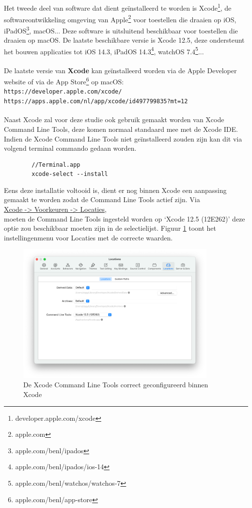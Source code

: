     \subsection{}
    \label{sec:I-Xcode}
    Het tweede deel van software dat dient geïnstalleerd te worden is Xcode\footnote{developer.apple.com/xcode}, de softwareontwikkeling omgeving van Apple\footnote{apple.com} voor toestellen die draaien op iOS, iPadOS\footnote{apple.com/benl/ipados}, macOS...  Deze software is uitsluitend beschikbaar voor toestellen die draaien op macOS. De laatste beschikbare versie is Xcode 12.5, deze ondersteunt het bouwen applicaties tot iOS 14.3, iPadOS 14.3\footnote{apple.com/benl/ipados/ios-14}, watchOS 7.4\footnote{apple.com/benl/watchos/watchos-7}... 
    \\ \\ 
    De laatste versie van \textbf{Xcode} kan geïnstalleerd worden via de Apple Developer website of via de App Store\footnote{apple.com/benl/app-store} op macOS: \\
    \verb*|https://developer.apple.com/xcode/|
    \\
    \verb*|https://apps.apple.com/nl/app/xcode/id497799835?mt=12|
    \\ \\ 
    Naast Xcode zal voor deze studie ook gebruik gemaakt worden van Xcode Command Line Tools, deze komen normaal standaard mee met de Xcode IDE. Indien de Xcode Command Line Tools niet geïnstalleerd zouden zijn kan dit via volgend terminal commando gedaan worden. \\
    \begin{lstlisting}
        //Terminal.app
        xcode-select --install
    \end{lstlisting}
    Eens deze installatie voltooid is, dient er nog binnen Xcode een aanpassing gemaakt te worden zodat de Command Line Tools actief zijn. Via \\
    \underline{Xcode -> Voorkeuren -> Locaties}, \\
    moeten de Command Line Tools ingesteld worden op `Xcode 12.5 (12E262)' deze optie zou beschikbaar moeten zijn in de selectielijst. Figuur \ref{fig:M-xcode-locations} toont het instellingenmenu voor Locaties met de correcte waarden. 
    \begin{figure}
        \centering
        \includegraphics[width=10cm]{img/xcode-locations}
        \caption{De Xcode Command Line Tools correct geconfigureerd binnen Xcode}
        \label{fig:M-xcode-locations}
    \end{figure}
    
